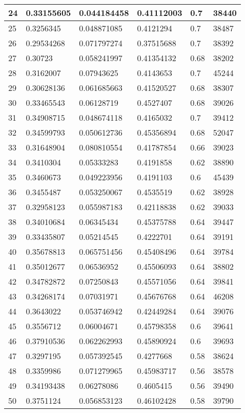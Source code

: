\begin{longtable}{|l|l|l|l|l|l|}
24 & 0.33155605 & 0.044184458 & 0.41112003 & 0.7 & 38440 \\ \hline 
25 & 0.3256345 & 0.048871085 & 0.4121294 & 0.7 & 38487 \\ \hline 
26 & 0.29534268 & 0.071797274 & 0.37515688 & 0.7 & 38392 \\ \hline 
27 & 0.30723 & 0.058241997 & 0.41354132 & 0.68 & 38202 \\ \hline 
28 & 0.3162007 & 0.07943625 & 0.4143653 & 0.7 & 45244 \\ \hline 
29 & 0.30628136 & 0.061685663 & 0.41520527 & 0.68 & 38307 \\ \hline 
30 & 0.33465543 & 0.06128719 & 0.4527407 & 0.68 & 39026 \\ \hline 
31 & 0.34908715 & 0.048674118 & 0.4165032 & 0.7 & 39412 \\ \hline 
32 & 0.34599793 & 0.050612736 & 0.45356894 & 0.68 & 52047 \\ \hline 
33 & 0.31648904 & 0.080810554 & 0.41787854 & 0.66 & 39023 \\ \hline 
34 & 0.3410304 & 0.05333283 & 0.4191858 & 0.62 & 38890 \\ \hline 
35 & 0.3460673 & 0.049223956 & 0.4191103 & 0.6 & 45439 \\ \hline 
36 & 0.3455487 & 0.053250067 & 0.4535519 & 0.62 & 38928 \\ \hline 
37 & 0.32958123 & 0.055987183 & 0.42118838 & 0.62 & 39033 \\ \hline 
38 & 0.34010684 & 0.06345434 & 0.45375788 & 0.64 & 39447 \\ \hline 
39 & 0.33435807 & 0.05214545 & 0.4222701 & 0.64 & 39191 \\ \hline 
40 & 0.35678813 & 0.065751456 & 0.45408496 & 0.64 & 39784 \\ \hline 
41 & 0.35012677 & 0.06536952 & 0.45506093 & 0.64 & 38802 \\ \hline 
42 & 0.34782872 & 0.07250843 & 0.45571056 & 0.64 & 39841 \\ \hline 
43 & 0.34268174 & 0.07031971 & 0.45676768 & 0.64 & 46208 \\ \hline 
44 & 0.3643022 & 0.053746942 & 0.42449284 & 0.64 & 39076 \\ \hline 
45 & 0.3556712 & 0.06004671 & 0.45798358 & 0.6 & 39641 \\ \hline 
46 & 0.37910536 & 0.062262993 & 0.45890924 & 0.6 & 39693 \\ \hline 
47 & 0.3297195 & 0.057392545 & 0.4277668 & 0.58 & 38624 \\ \hline 
48 & 0.3359986 & 0.071279965 & 0.45983717 & 0.56 & 38578 \\ \hline 
49 & 0.34193438 & 0.06278086 & 0.4605415 & 0.56 & 39490 \\ \hline 
50 & 0.3751124 & 0.056853123 & 0.46102428 & 0.58 & 39790 \\ \hline 
\end{longtable}